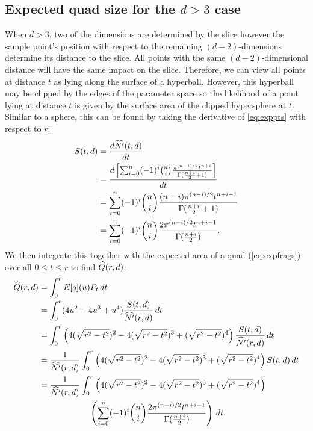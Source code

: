 \subsection{Expected quad size for the $d>3$ case}


When $d>3$, two of the dimensions are determined by the slice however the
sample point's position with respect to the remaining $(d-2)$-dimensions 
determine its distance to the slice.  All points with the same 
$(d-2)$-dimensional distance will have the same impact on the slice.
Therefore, we can view all points at distance $t$ as lying along the surface 
of a hyperball.  However, this hyperball may be clipped by the edges of the
parameter space so the likelihood of a point lying at distance $t$ is given
by the surface area of the clipped hypersphere at $t$.  Similar to a sphere,
this can be found by taking the derivative of \autoref{eq:exppts} with 
respect to $r$:
\begin{align*}
 S(t,d) 
   &= \frac{d \widehat{N'}(t, d)}{d t} \\
   &= \frac{d \left[
    \sum_{i=0}^{n} (-1)^{i} {n \choose i}
         \frac{\pi^{(n-i)/2}t^{n+i}}{\Gamma(\frac{n+i}{2} + 1)} 
 \right]}{dt} \\
   &= \sum_{i=0}^{n} (-1)^{i} {n \choose i}
         \frac{(n+i)\pi^{(n-i)/2}t^{n+i-1}}{\Gamma(\frac{n+i}{2} + 1)} \\
   &= \sum_{i=0}^{n} (-1)^{i} {n \choose i}
         \frac{2\pi^{(n-i)/2}t^{n+i-1}}{\Gamma(\frac{n+i}{2})} 
         \text{.}
\end{align*}
We then integrate this
together with the expected area of a quad (\autoref{eq:expfrags}) over
all $0 \le t \le r$ to find $\widehat{Q}(r,d)$:
\begin{align*}
\widehat{Q}(r,d) &= \int_0^r E[q](u) P_t \, dt \\
     &= \int_0^r (4u^2 - 4u^3 + u^4)
        \frac{S(t,d)}{\widehat{N'}(r, d)} \, dt \\
     &= \int_0^r 
        \left(4(\sqrt{r^2-t^2})^2 - 4(\sqrt{r^2-t^2})^3 + (\sqrt{r^2-t^2})^4\right)
        \frac{S(t,d)}{\widehat{N'}(r, d)} \, dt \\
     &= \frac{1}{\widehat{N'}(r, d)} \int_0^r 
        \left(4(\sqrt{r^2-t^2})^2 - 4(\sqrt{r^2-t^2})^3 + (\sqrt{r^2-t^2})^4\right)
        S(t,d) \, dt \\
     &= \frac{1}{\widehat{N'}(r, d)} \int_0^r 
        \left(4(\sqrt{r^2-t^2})^2 - 4(\sqrt{r^2-t^2})^3 + (\sqrt{r^2-t^2})^4\right) \\
     &\qquad\qquad\qquad
       \left(
           \sum_{i=0}^{n} (-1)^{i} {n \choose i}
               \frac{2\pi^{(n-i)/2}t^{n+i-1}}{\Gamma(\frac{n+i}{2})} 
        \right) \, dt 
        \text{.}
\end{align*}

